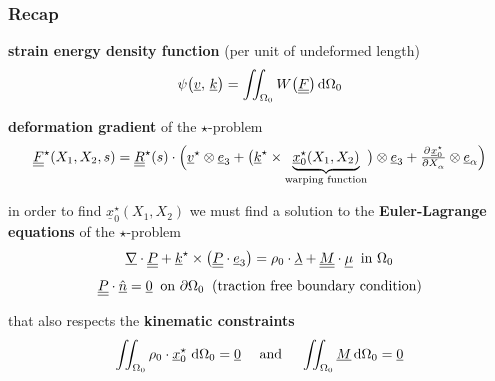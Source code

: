 \begin{frame}
  \frametitle{Recap}

  \textbf{strain energy density function} (per unit of undeformed length)
  \begin{displaymath}
    \psi \bigl( \underline{v} , \, \underline{k} \bigr) =
    \iint_{\Omega_0} W \bigl( \doubleunderline{F} \bigr) \dif \Omega_0
  \end{displaymath}
  
  \textbf{deformation gradient} of the $\star$-problem
  \begin{displaymath}
    \doubleunderline{F}^{\star}(X_1,X_2,s) =
    \doubleunderline{R}^{\star}(s) \cdot \Bigl(
      \underline{v}^{\star} \otimes \underline{e}_3 +
      \bigl( \underline{k}^{\star} \times \underbrace{ \underline{x}_0^{\star}(X_1,X_2) }_{\text{warping function}} \bigr) \otimes \underline{e}_3 +
      \pd{\underline{x}_0^{\star}}{X_{\alpha}} \otimes \underline{e}_{\alpha}
    \Bigr)
  \end{displaymath}
  
  in order to find $\underline{x}_0^{\star}(X_1,X_2)$ we must find a solution to the
  \textbf{Euler-Lagrange equations} of the $\star$-problem
  \begin{displaymath}
    \underline{\nabla} \cdot \underline{\underline{P}} +
    \underline{k}^{\star} \times \bigl( \underline{\underline{P}} \cdot \underline{e}_3 \bigr) =
    \rho_0 \cdot \underline{\lambda} +
    \underline{\underline{M}} \cdot \underline{\mu}
    \: \text{ in } \Omega_0    
  \end{displaymath}
  \begin{displaymath}
    \underline{\underline{P}} \cdot \underline{\hat{n}} = \underline{0}
    \: \text{ on } \partial \Omega_0
    \: \text{ (traction free boundary condition)}
  \end{displaymath}
  
  \vspace{0.5em}
  that also respects the \textbf{kinematic constraints}
  \begin{displaymath}
    \iint_{\Omega_0} \rho_0 \cdot \underline{x}_0^{\star} \, \dif \Omega_0 = \underline{0}
    \quad \text{ and } \quad
    \iint_{\Omega_0} \underline{M} \dif \Omega_0 = \underline{0}
  \end{displaymath}

\end{frame}



